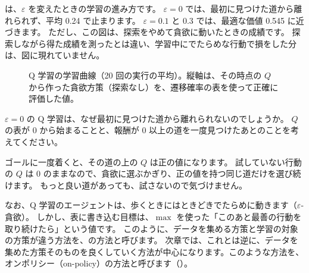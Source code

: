 は、$\varepsilon$ を変えたときの学習の進み方です。
$\varepsilon=0$ では、最初に見つけた道から離れられず、平均 0.24 で止まります。
$\varepsilon=0.1$ と $0.3$ では、最適な価値 0.545 に近づきます。
ただし、この図は、探索をやめて貪欲に動いたときの成績です。
探索しながら得た成績を測ったとは違い、学習中にでたらめな行動で損をした分は、図に現れていません。

\begin{figure}[tbp]
\centering
{}
\caption{Q 学習の学習曲線（20 回の実行の平均）。縦軸は、その時点の $Q$ から作った貪欲方策（探索なし）を、遷移確率の表を使って正確に評価した値。}
\label{fig:rlb-q-curve}
\end{figure}

\begin{quiz}
$\varepsilon=0$ の Q 学習は、なぜ最初に見つけた道から離れられないのでしょうか。
$Q$ の表が 0 から始まることと、報酬が 0 以上の道を一度見つけたあとのことを考えてください。
\end{quiz}

ゴールに一度着くと、その道の上の $Q$ は正の値になります。
試していない行動の $Q$ は 0 のままなので、貪欲に選ぶかぎり、正の値を持つ同じ道だけを選び続けます。
もっと良い道があっても、試さないので気づけません。

なお、Q 学習のエージェントは、歩くときにはときどきでたらめに動きます（$\varepsilon$-貪欲）。
しかし、表に書き込む目標は、$\max$ を使った「このあと最善の行動を取り続けたら」という値です。
このように、データを集める方策と学習の対象の方策が違う方法を、の方法と呼びます。
次章では、これとは逆に、データを集めた方策そのものを良くしていく方法が中心になります。このような方法を、オンポリシー（on-policy）の方法と呼びます（）。

